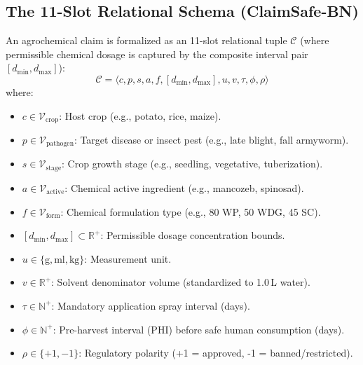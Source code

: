 \documentclass[11pt,a4paper]{article}
\begin{document}
\subsection{The 11-Slot Relational Schema (ClaimSafe-BN)}
An agrochemical claim is formalized as an 11-slot relational tuple $\mathcal{C}$ (where permissible chemical dosage is captured by the composite interval pair $[d_{\min}, d_{\max}]$):
\begin{equation}
\label{eq:claim_tuple}
\mathcal{C} = \langle c, p, s, a, f, [d_{\min}, d_{\max}], u, v, \tau, \phi, \rho \rangle
\end{equation}
where:
\begin{itemize}[leftmargin=1.5em]
    \item $c \in \mathcal{V}_{\text{crop}}$: Host crop (e.g., potato, rice, maize).
    \item $p \in \mathcal{V}_{\text{pathogen}}$: Target disease or insect pest (e.g., late blight, fall armyworm).
    \item $s \in \mathcal{V}_{\text{stage}}$: Crop growth stage (e.g., seedling, vegetative, tuberization).
    \item $a \in \mathcal{V}_{\text{active}}$: Chemical active ingredient (e.g., mancozeb, spinosad).
    \item $f \in \mathcal{V}_{\text{form}}$: Chemical formulation type (e.g., 80 WP, 50 WDG, 45 SC).
    \item $[d_{\min}, d_{\max}] \subset \mathbb{R}^+$: Permissible dosage concentration bounds.
    \item $u \in \{\text{g}, \text{ml}, \text{kg}\}$: Measurement unit.
    \item $v \in \mathbb{R}^+$: Solvent denominator volume (standardized to 1.0\,L water).
    \item $\tau \in \mathbb{N}^+$: Mandatory application spray interval (days).
    \item $\phi \in \mathbb{N}^+$: Pre-harvest interval (PHI) before safe human consumption (days).
    \item $\rho \in \{+1, -1\}$: Regulatory polarity (+1 = approved, -1 = banned/restricted).
\end{itemize}
\end{document}
